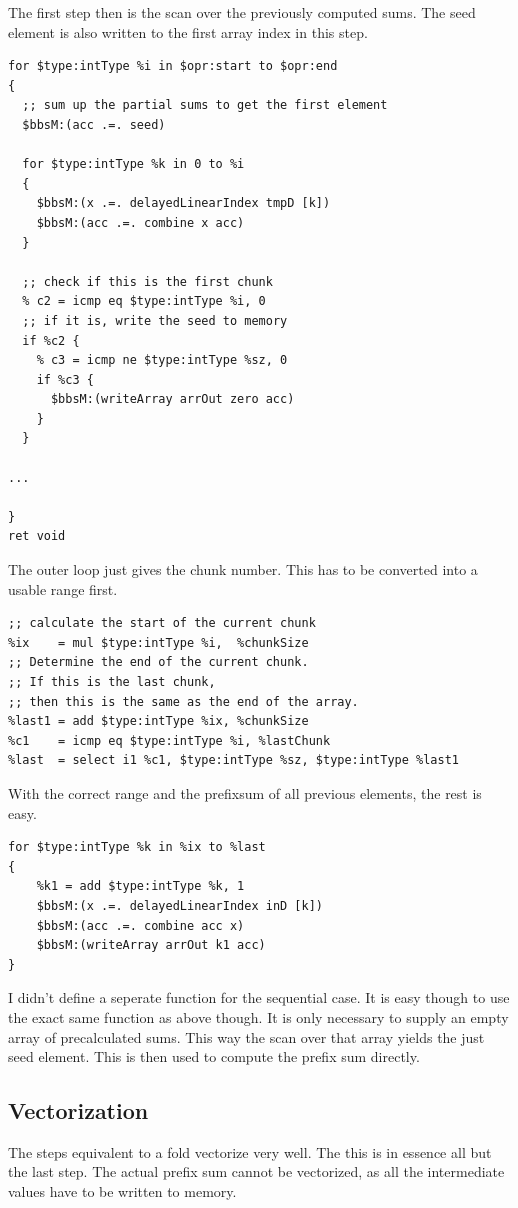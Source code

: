 \documentclass[a4paper,bibliography=totocnumbered,parskip,headsepline]{scrbook}
\begin{document}
The first step then is the scan over the previously computed sums.
The seed element is also written to the first array index in this step.
\begin{lstlisting}
for $type:intType %i in $opr:start to $opr:end
{
  ;; sum up the partial sums to get the first element
  $bbsM:(acc .=. seed)

  for $type:intType %k in 0 to %i
  {
    $bbsM:(x .=. delayedLinearIndex tmpD [k])
    $bbsM:(acc .=. combine x acc)
  }

  ;; check if this is the first chunk
  % c2 = icmp eq $type:intType %i, 0
  ;; if it is, write the seed to memory
  if %c2 {
    % c3 = icmp ne $type:intType %sz, 0
    if %c3 {
      $bbsM:(writeArray arrOut zero acc)
    }
  }

...

}
ret void
\end{lstlisting}
\begin{minipage}{\textwidth}
The outer loop just gives the chunk number.
This has to be converted into a usable range first.
\begin{lstlisting}
;; calculate the start of the current chunk
%ix    = mul $type:intType %i,  %chunkSize
;; Determine the end of the current chunk.
;; If this is the last chunk,
;; then this is the same as the end of the array.
%last1 = add $type:intType %ix, %chunkSize
%c1    = icmp eq $type:intType %i, %lastChunk
%last  = select i1 %c1, $type:intType %sz, $type:intType %last1
\end{lstlisting}
\end{minipage}

With the correct range and the prefixsum of all previous elements, the rest is easy.
\begin{lstlisting}
for $type:intType %k in %ix to %last
{
    %k1 = add $type:intType %k, 1
    $bbsM:(x .=. delayedLinearIndex inD [k])
    $bbsM:(acc .=. combine acc x)
    $bbsM:(writeArray arrOut k1 acc)
}
\end{lstlisting}

I didn't define a seperate function for the sequential case.
It is easy though to use the exact same function as above though.
It is only necessary to supply an empty array of precalculated sums.
This way the scan over that array yields the just seed element.
This is then used to compute the prefix sum directly.

\subsection*{Vectorization}
The steps equivalent to a fold vectorize very well.
The this is in essence all but the last step.
The actual prefix sum cannot be vectorized, as all the intermediate values have to be written to memory.
\end{document}

